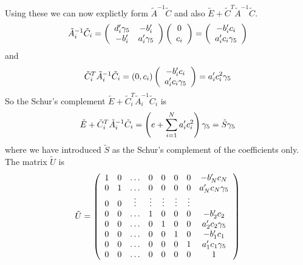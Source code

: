 \documentclass[12pt]{article}
\begin{document}
Using these we can now explictly form $\tilde{A}^{-1}\tilde{C}$ and
also $\tilde{E} + \tilde{C}^{T}\tilde{A}^{-1} \tilde{C}$.
\begin{equation}
\tilde{A}_i^{-1} \tilde{C}_{i} =  \left( \begin{array}{cc}
 d'_i \gamma_5 & -b'_i \\
-b'_i & a'_i \gamma_5 \\
\end{array} \right) \left( \begin{array}{c}
 0 \\
c_i \\
\end{array} \right) = \left( \begin{array}{c} 
-b'_i c_i \\
a'_i c_i \gamma_5 
\end{array} \right)
\end{equation}
and
\begin{equation}
\tilde{C}_i^{T} \tilde{A}^{-1}_i \tilde{C}_i = \left( 0, c_i \right) \left( \begin{array}{c}
-b'_i c_i \\
a'_i c_i \gamma_5 
\end{array} \right) = a'_i c^{2}_i \gamma_5
\end{equation}
So the Schur's complement $\tilde{E} + \tilde{C}_i^{T} \tilde{A}^{-1}_i \tilde{C}_i$ is
\begin{equation}
\tilde{E} + \tilde{C}_i^{T} \tilde{A}^{-1}_i \tilde{C}_i = \left( e + \sum_{i=1}^{N} a'_i c^{2}_i \right) \gamma_5 = \tilde{S} \gamma_5
\end{equation}
where we have introduced $\tilde{S}$ as the Schur's complement of the coefficients only. The matrix $\tilde{U}$ is 
\begin{equation}
\tilde{U} = \left( \begin{array}{cccccccc} 
1 & 0 & \ldots & 0 & 0 & 0 & 0 & -b'_N c_N \\
0 & 1 & \ldots & 0 & 0 & 0 & 0 &  a'_N c_N \gamma_5 \\
0 & 0 & \vdots & \vdots & \vdots & \vdots & \vdots \\
0 & 0 & \ldots & 1 & 0 & 0 & 0 & -b'_2 c_2 \\
0 & 0 & \ldots & 0 & 1 & 0 & 0 &  a'_2 c_2 \gamma_5 \\
0 & 0 & \ldots & 0 & 0 & 1 & 0 & -b'_1 c_1 \\
0 & 0 & \ldots & 0 & 0 & 0 & 1 &  a'_1 c_1 \gamma_5 \\
0 & 0 & \ldots & 0 & 0 & 0 & 0 &     1
\end{array} \right)
\end{equation}
\end{document}
